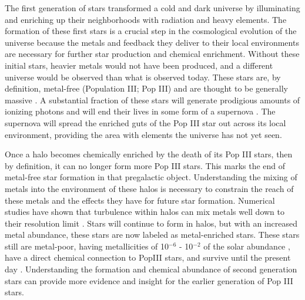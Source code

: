 \documentclass[a4paper,fleqn,usenatbib]{mnras}
\begin{document}
The first generation of stars transformed a cold and dark universe
by illuminating and enriching up their neighborhoods with radiation
and heavy elements. The formation of these first stars is a crucial step in the cosmological evolution of the universe because the metals and feedback they deliver to their local environments are necessary for further star production and chemical enrichment. Without these initial stars, heavier metals would not have been produced, and a different universe would be observed than what is observed today. These stars are, by definition, metal-free (Population III; Pop III) and are thought to be generally massive \citep{ABN02, Bromm02_P3, Turk09, Hosokawa11, Hosokawa16, Hirano15}. A substantial fraction of these stars will generate prodigious amounts of ionizing photons and will end their lives in some form of a supernova \citep[e.g.][]{Schaerer02, Heger02}. The supernova will spread the enriched guts of the Pop III star out across its local environment, providing the area with elements the universe has not yet seen. 

Once a halo becomes chemically enriched by the death of its Pop III stars, then by definition, it can no longer form more Pop III stars. This marks the end of metal-free star formation in that pregalactic object. Understanding the mixing of metals into the environment of these halos is necessary to constrain the reach of these metals and the effects they have for future star formation. Numerical studies have shown that turbulence within halos can mix metals well down to their resolution limit \citep[][and more]{Wise08_Gal, Greif10}. Stars will continue to form in halos, but with an increased metal abundance, these stars are now labeled as metal-enriched stars. These stars still are metal-poor, having metallicities of 10$^{-6}$ - 10$^{-2}$ of the solar abundance \citep{Chiaki16, Chiaki18, Ritter16}, have a direct chemical connection to PopIII stars, and survive until the present day \citep{Gnedin06, Tumlinson10, Griffen18, Magg18}. Understanding the formation and chemical abundance of second generation stars can provide more evidence and insight for the earlier generation of Pop III stars.
\end{document}
